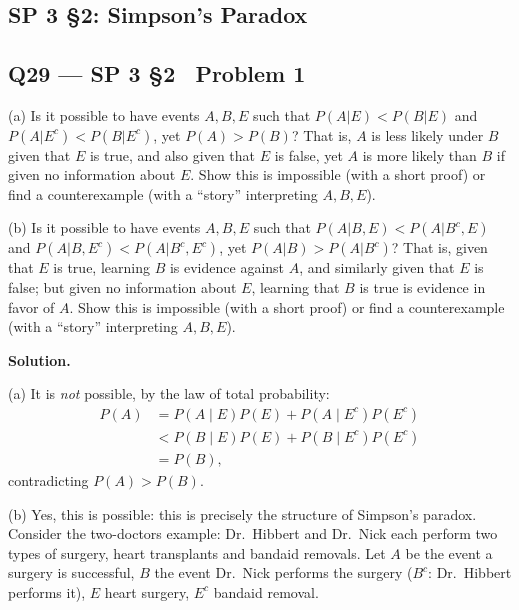 \documentclass[11pt]{article}
\begin{document}
\subsection{SP 3 \S2: Simpson's Paradox}

\subsection*{Q29 --- SP 3 \S2 \textperiodcentered\ Problem 1}
\begin{qbox}
(a) Is it possible to have events $A, B, E$ such that $P(A|E) < P(B|E)$ and $P(A|E^c) < P(B|E^c)$, yet $P(A) > P(B)$? That is, $A$ is less likely under $B$ given that $E$ is true, and also given that $E$ is false, yet $A$ is more likely than $B$ if given no information about $E$. Show this is impossible (with a short proof) or find a counterexample (with a ``story'' interpreting $A, B, E$).

(b) Is it possible to have events $A, B, E$ such that $P(A|B,E) < P(A|B^c, E)$ and $P(A|B,E^c) < P(A|B^c, E^c)$, yet $P(A|B) > P(A|B^c)$? That is, given that $E$ is true, learning $B$ is evidence against $A$, and similarly given that $E$ is false; but given no information about $E$, learning that $B$ is true is evidence in favor of $A$. Show this is impossible (with a short proof) or find a counterexample (with a ``story'' interpreting $A, B, E$).
\end{qbox}
\textbf{Solution.}

(a) It is \emph{not} possible, by the law of total probability:
\begin{align*}
P(A) &= P(A\mid E)P(E)+P(A\mid E^c)P(E^c) \\
&< P(B\mid E)P(E)+P(B\mid E^c)P(E^c) \\
&= P(B),
\end{align*}
contradicting $P(A)>P(B)$.

(b) Yes, this is possible: this is precisely the structure of Simpson's paradox. Consider the two-doctors example: Dr.\ Hibbert and Dr.\ Nick each perform two types of surgery, heart transplants and bandaid removals. Let $A$ be the event a surgery is successful, $B$ the event Dr.\ Nick performs the surgery ($B^c$: Dr.\ Hibbert performs it), $E$ heart surgery, $E^c$ bandaid removal.
\end{document}
